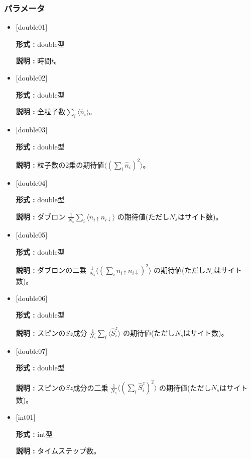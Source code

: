 \subsubsection{パラメータ}
 \begin{itemize}

  \item  $[$double01$]$
  
 {\bf 形式 :} double型

{\bf 説明 :} 時間$t$。
 
  \item $[$double02$]$

 {\bf 形式 :} double型 

{\bf 説明 :}  全粒子数$\sum_{i} \langle \hat{n}_i \rangle$。

  \item $[$double03$]$

 {\bf 形式 :} double型 

{\bf 説明 :} 粒子数の2乗の期待値$\langle (\sum_{i} \hat{n}_i)^2 \rangle$。

  \item $[$double04$]$

 {\bf 形式 :} double型 

{\bf 説明 :} ダブロン
$\frac{1}{N_s} \sum_{i}\langle n_{i\uparrow}n_{i\downarrow}\rangle$ の期待値(ただし$N_s$はサイト数)。

  \item $[$double05$]$

 {\bf 形式 :} double型 

{\bf 説明 :} ダブロンの二乗
$\frac{1}{N_s} \langle (\sum_{i}n_{i\uparrow} n_{i\downarrow})^2\rangle$ の期待値(ただし$N_s$はサイト数)。

  \item $[$double06$]$

 {\bf 形式 :} double型 

{\bf 説明 :} スピンの$Sz$成分
$\frac{1}{N_s} \sum_{i}\langle \hat{S}_i^z\rangle$ の期待値(ただし$N_s$はサイト数)。

  \item $[$double07$]$

 {\bf 形式 :} double型 

{\bf 説明 :} スピンの$Sz$成分の二乗
$\frac{1}{N_s} \langle (\sum_{i}\hat{S}_i^z)^2\rangle$ の期待値(ただし$N_s$はサイト数)。

  \item $[$int01$]$

 {\bf 形式 :} int型 

{\bf 説明 :} タイムステップ数。

 \end{itemize}



